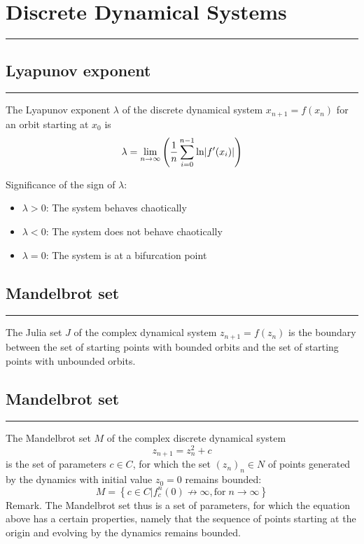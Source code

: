 \section{Discrete Dynamical Systems}
\noindent\rule[\linienAbstand]{\linewidth}{\linienDickeDick}

\subsection{Lyapunov exponent}
\noindent\rule[\linienAbstand]{\linewidth}{\linienDicke}
The Lyapunov exponent $\lambda$ of the discrete dynamical system $x_{n+1} = f(x_n)$ for an orbit starting at $x_0$ is
\begin{equation}
  \lambda = \lim_{n \to \infty}\left(\frac{1}{n} \sum_{i=0}^{n-1} \textup{ln}|f'(x_i)|\right)
\end{equation}

Significance of the sign of $\lambda$:
\begin{itemize}
  \item $\lambda > 0$: The system behaves chaotically
  \item $\lambda < 0$: The system does not behave chaotically
  \item $\lambda = 0$: The system is at a bifurcation point
\end{itemize}

\subsection{Mandelbrot set}
\noindent\rule[\linienAbstand]{\linewidth}{\linienDicke}
The Julia set $J$ of the complex dynamical system $z_{n+1} = f(z_n)$ is the boundary between the set of starting points with bounded orbits and the set of starting points with unbounded orbits.


\subsection{Mandelbrot set}
\noindent\rule[\linienAbstand]{\linewidth}{\linienDicke}
The Mandelbrot set $M$ of the complex discrete dynamical system
\begin{equation}
  z_{n + 1} = z_n^2 + c
\end{equation}
is the set of parameters $c \in C$, for which the set $(z_n)_n \in N$ of points generated by the dynamics with initial value $z_0 = 0$ remains bounded:
\begin{equation}
  M = \left\{c\in C| f_c^n(0) \not\to \infty, \text{for}\; n \to \infty \right\}
\end{equation}
Remark. The Mandelbrot set thus is a set of parameters, for which the equation above has a certain properties, namely that the sequence of points starting at the origin and evolving by the dynamics remains bounded.
